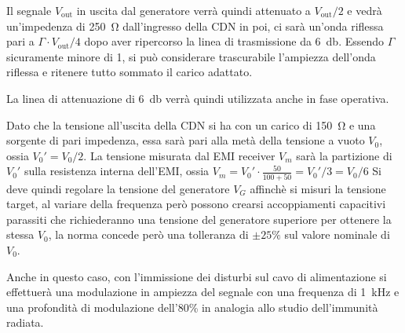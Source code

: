 Il segnale $V_{\text{out}}$ in uscita dal generatore
verrà quindi attenuato a $V_{\text{out}}/2$ e vedrà un'impedenza
di \SI{250}{\ohm} dall'ingresso della CDN in poi, ci sarà un'onda
riflessa pari a $\Gamma\cdot V_{\text{out}}/4$ dopo aver ripercorso la linea 
di trasmissione da \SI{6}{\decibel}. Essendo $\Gamma$ sicuramente minore di 1,
si può considerare trascurabile l'ampiezza dell'onda riflessa e ritenere tutto
sommato il carico adattato.

La linea di attenuazione di \SI{6}{\decibel} verrà quindi utilizzata anche in fase 
operativa.

Dato che la tensione all'uscita della CDN si ha con un carico di \SI{150}{\ohm} e 
una sorgente di pari impedenza, essa sarà pari alla metà della tensione a 
vuoto $V_0$, ossia $V_0' = V_0/2$. La tensione misurata dal EMI receiver
$V_m$ sarà la partizione di $V_0'$ sulla resistenza interna dell'EMI, ossia
$V_m = V_0' \cdot \frac{50}{100+50} = V_0'/3 = V_0/6$
Si deve quindi regolare la tensione del generatore $V_G$ affinchè si misuri
la tensione target, al variare della frequenza però possono crearsi accoppiamenti
capacitivi parassiti che richiederanno una tensione del generatore superiore
per ottenere la stessa $V_0$, la norma concede però una tolleranza
di $\pm 25\%$ sul valore nominale di $V_0$.

Anche in questo caso, con l'immissione dei disturbi sul cavo di alimentazione
si effettuerà una modulazione in ampiezza del segnale con una frequenza
di \SI{1}{\kilo\hertz} e una profondità di modulazione dell'80\% in analogia
allo studio dell'immunità radiata.
